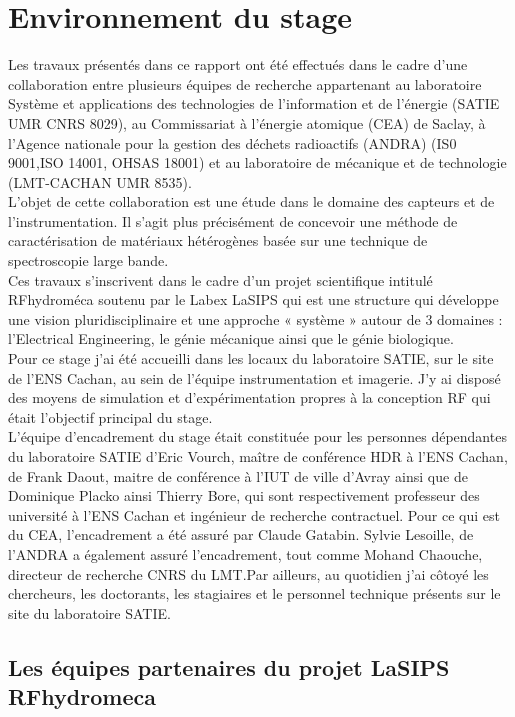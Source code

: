 \chapter{Environnement du stage}
Les travaux présentés dans ce rapport ont été effectués dans le cadre d'une collaboration entre plusieurs équipes de recherche appartenant au laboratoire Système et applications des technologies de l'information et de l'énergie (SATIE UMR CNRS 8029), au Commissariat à l'énergie atomique (CEA) de Saclay, à l'Agence nationale pour la gestion des déchets radioactifs (ANDRA) (IS0 9001,ISO 14001, OHSAS 18001) et au laboratoire de mécanique et de technologie (LMT-CACHAN UMR 8535).\\
L'objet de cette collaboration est une étude dans le domaine des capteurs et de l'instrumentation. Il s'agit plus précisément de concevoir une méthode de caractérisation de matériaux hétérogènes basée sur une technique de spectroscopie large bande.\\
Ces travaux s'inscrivent dans le cadre d’un projet scientifique intitulé RFhydroméca soutenu par le Labex LaSIPS qui est une structure qui développe une vision pluridisciplinaire et une approche « système » autour de 3 domaines : l'Electrical Engineering, le génie mécanique ainsi que le génie biologique.\\
Pour ce stage j'ai été accueilli dans les locaux du laboratoire SATIE, sur le site de l'ENS Cachan, au sein de l'équipe instrumentation et imagerie. J'y ai disposé des moyens de simulation et d'expérimentation propres à la conception RF qui était l'objectif principal du stage.\\
L'équipe d'encadrement du stage était constituée pour les personnes dépendantes du laboratoire SATIE d'Eric Vourch, maître de conférence HDR à l'ENS Cachan, de Frank Daout, maitre de conférence à l'IUT de ville d'Avray ainsi que de Dominique Placko ainsi Thierry Bore, qui sont respectivement professeur des université à l'ENS Cachan et ingénieur de recherche contractuel. Pour ce qui est du CEA, l'encadrement a été assuré par Claude Gatabin. Sylvie Lesoille, de l'ANDRA a également assuré l'encadrement, tout comme Mohand Chaouche, directeur de recherche CNRS du LMT.Par ailleurs, au quotidien j'ai côtoyé les chercheurs, les doctorants, les stagiaires et le personnel technique présents sur le site du laboratoire SATIE.
\section{Les équipes partenaires du projet LaSIPS RFhydromeca}
